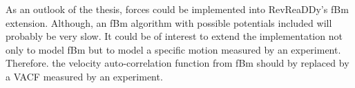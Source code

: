 \documentclass[
  a4paper,BCOR10mm,twoside,
  headsepline,footsepline,%
  fleqn,openbib
]{scrbook}
\begin{document}
\par As an outlook of the thesis, forces could be implemented into RevReaDDy's fBm extension.  Although, an fBm algorithm with possible potentials included will probably be very slow. It could be of interest to extend the implementation not only to model fBm but to model a specific motion measured by an experiment. Therefore. the velocity auto-correlation function from fBm should by replaced by a VACF measured by an experiment.

\end{document}
